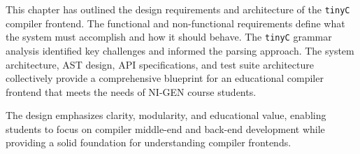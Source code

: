 This chapter has outlined the design requirements and architecture of the \texttt{tinyC} compiler frontend. The functional and non-functional requirements define what the system must accomplish and how it should behave. The \texttt{tinyC} grammar analysis identified key challenges and informed the parsing approach. The system architecture, AST design, API specifications, and test suite architecture collectively provide a comprehensive blueprint for an educational compiler frontend that meets the needs of NI-GEN course students.

The design emphasizes clarity, modularity, and educational value, enabling students to focus on compiler middle-end and back-end development while providing a solid foundation for understanding compiler frontends.